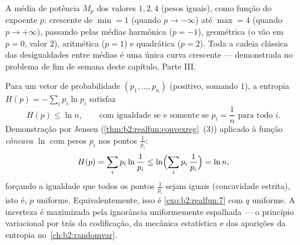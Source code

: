 \begin{omfigure}

{\small A média de potência $M_p$ dos valores $1, 2, 4$ (pesos
iguais), como função do expoente $p$: crescente de
$\min = 1$ (quando $p \to -\infty$) até $\max = 4$ (quando $p \to
+\infty$), passando pelas médias harmônica ($p = -1$), geométrica (o vão
em $p = 0$, valor $2$), aritmética ($p = 1$) e quadrática ($p
= 2$). Toda a cadeia clássica das desigualdades entre médias é
uma única curva crescente --- demonstrada no problema de fim de semana
deste capítulo, Parte III.}
\end{omfigure}

\begin{example}\label{ex:b2:realfun:entropy}
Para um vetor de probabilidade $(p_1, \dots, p_n)$ (positivo,
somando $1$), a entropia $H(p) = -\sum_i p_i\ln p_i$
satisfaz
\[
H(p) \leq \ln n ,
\qquad\text{com igualdade se e somente se } p_i = \frac1n \text{ para todo }
i .
\]
Demonstração por Jensen (\cref{thm:b2:realfun:convexreg}~(3)) aplicado à
função \emph{côncava} $\ln$ com pesos $p_i$ nos pontos
$\frac{1}{p_i}$:
\[
H(p) = \sum_i p_i\ln\frac{1}{p_i}
\leq \ln\Bigl(\sum_i p_i\,\frac1{p_i}\Bigr) = \ln n ,
\]
forçando a igualdade que todos os pontos $\frac1{p_i}$ sejam iguais (concavidade
estrita), isto é, $p$ uniforme. Equivalentemente, isso é
\cref{exo:b2:realfun:7} com $q$ uniforme. A incerteza é
maximizada pela ignorância uniformemente espalhada --- o princípio
variacional por trás da codificação, da mecânica estatística e das aparições
da entropia no~\cref{ch:b2:randomvar}.
\end{example}

